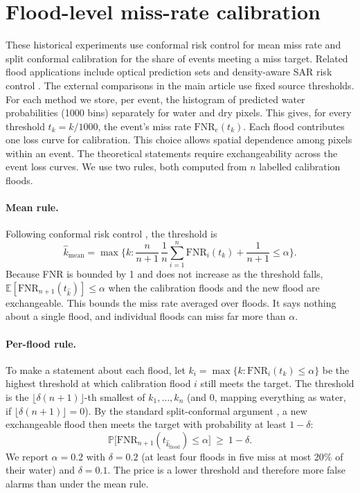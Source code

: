 \section{Flood-level miss-rate calibration}
\label{sec:calib}
These historical experiments use conformal risk control for mean miss rate and split conformal calibration for the share of events meeting a miss target. Related flood applications include optical prediction sets and density-aware SAR risk control \citep{konidakis2025cpflood,li2026crcflood}. The external comparisons in the main article use fixed source thresholds.
For each method we store, per event, the histogram of predicted water probabilities (1000 bins) separately for water and dry pixels. This gives, for every threshold $t_k=k/1000$, the event's miss rate $\mathrm{FNR}_e(t_k)$. Each flood contributes one loss curve for calibration. This choice allows spatial dependence among pixels within an event. The theoretical statements require exchangeability across the event loss curves. We use two rules, both computed from $n$ labelled calibration floods.

\paragraph{Mean rule.} Following conformal risk control \citep{angelopoulos2024crc}, the threshold is
\begin{equation}
\hat{k}_{\mathrm{mean}} = \max\Big\{k : \frac{n}{n+1}\,\frac{1}{n}\sum_{i=1}^{n}\mathrm{FNR}_i(t_k) + \frac{1}{n+1} \le \alpha\Big\}.
\label{eq:mean}
\end{equation}
Because FNR is bounded by 1 and does not increase as the threshold falls, $\mathbb{E}[\mathrm{FNR}_{n+1}(t_{\hat{k}})]\le\alpha$ when the calibration floods and the new flood are exchangeable. This bounds the miss rate averaged over floods. It says nothing about a single flood, and individual floods can miss far more than $\alpha$.

\paragraph{Per-flood rule.} To make a statement about each flood, let $k_i=\max\{k:\mathrm{FNR}_i(t_k)\le\alpha\}$ be the highest threshold at which calibration flood $i$ still meets the target. The threshold is the $\lfloor\delta(n+1)\rfloor$-th smallest of $k_1,\dots,k_n$ (and $0$, mapping everything as water, if $\lfloor\delta(n+1)\rfloor=0$). By the standard split-conformal argument \citep{vovk2022alrw,lei2018distfree}, a new exchangeable flood then meets the target with probability at least $1-\delta$:
\begin{equation}
\mathbb{P}\big[\mathrm{FNR}_{n+1}(t_{\hat{k}_{\mathrm{flood}}})\le\alpha\big]\ \ge\ 1-\delta .
\label{eq:flood}
\end{equation}
We report $\alpha=0.2$ with $\delta=0.2$ (at least four floods in five miss at most 20\% of their water) and $\delta=0.1$. The price is a lower threshold and therefore more false alarms than under the mean rule.

